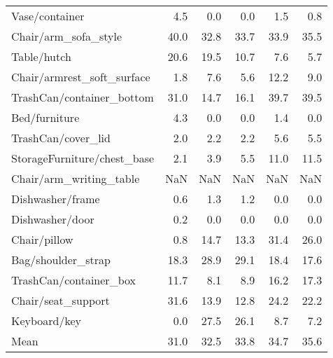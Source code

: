 \begin{table}[!h]
\begin{tabular}{lrrrrr}
Vase/container                 &            4.5 &             0.0 &                     0.0 &           1.5 &                   0.8 \\
Chair/arm\_sofa\_style           &           40.0 &            32.8 &                    33.7 &          33.9 &                  35.5 \\
Table/hutch                    &           20.6 &            19.5 &                    10.7 &           7.6 &                   5.7 \\
Chair/armrest\_soft\_surface     &            1.8 &             7.6 &                     5.6 &          12.2 &                   9.0 \\
TrashCan/container\_bottom      &           31.0 &            14.7 &                    16.1 &          39.7 &                  39.5 \\
Bed/furniture                  &            4.3 &             0.0 &                     0.0 &           1.4 &                   0.0 \\
TrashCan/cover\_lid             &            2.0 &             2.2 &                     2.2 &           5.6 &                   5.5 \\
StorageFurniture/chest\_base    &            2.1 &             3.9 &                     5.5 &          11.0 &                  11.5 \\
Chair/arm\_writing\_table        &            NaN &             NaN &                     NaN &           NaN &                   NaN \\
Dishwasher/frame               &            0.6 &             1.3 &                     1.2 &           0.0 &                   0.0 \\
Dishwasher/door                &            0.2 &             0.0 &                     0.0 &           0.0 &                   0.0 \\
Chair/pillow                   &            0.8 &            14.7 &                    13.3 &          31.4 &                  26.0 \\
Bag/shoulder\_strap             &           18.3 &            28.9 &                    29.1 &          18.4 &                  17.6 \\
TrashCan/container\_box         &           11.7 &             8.1 &                     8.9 &          16.2 &                  17.3 \\
Chair/seat\_support             &           31.6 &            13.9 &                    12.8 &          24.2 &                  22.2 \\
Keyboard/key                   &            0.0 &            27.5 &                    26.1 &           8.7 &                   7.2 \\
\midrule
Mean                           &           31.0 &            32.5 &                    33.8 &          34.7 &                  35.6 \\
\bottomrule
\end{tabular}
\end{table}


